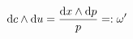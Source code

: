 \documentclass[preview]{standalone}
\begin{document}
\begin{align*}
\special{dvisvgm:raw <g id='unique000'>}\mathrm{d}c\wedge\mathrm{d}u=\frac{\mathrm{d}x\wedge\mathrm{d}p}{p}=:\omega'\special{dvisvgm:raw </g>}
\end{align*}
\end{document}

